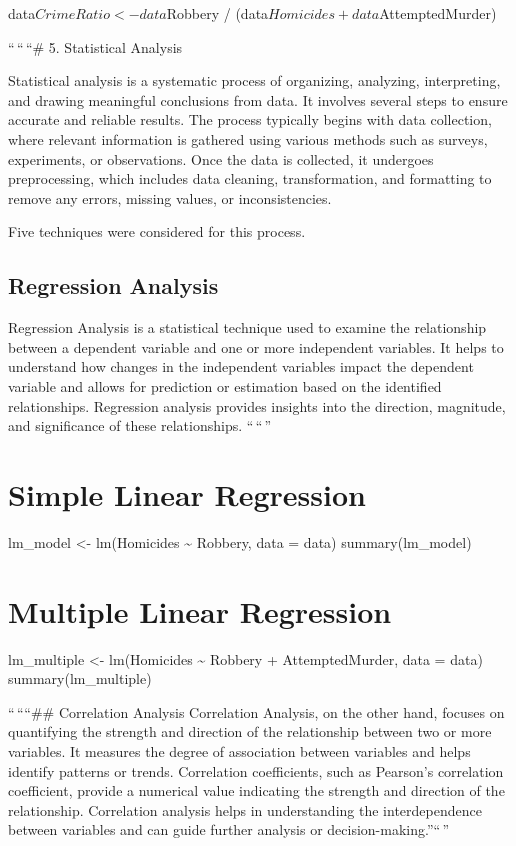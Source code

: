 \documentclass[
]{article}
\begin{document}
data\(CrimeRatio <- data\)Robbery /
(data\(Homicides + data\)AttemptedMurder)

``\,``\,``\# 5. Statistical Analysis

Statistical analysis is a systematic process of organizing, analyzing,
interpreting, and drawing meaningful conclusions from data. It involves
several steps to ensure accurate and reliable results. The process
typically begins with data collection, where relevant information is
gathered using various methods such as surveys, experiments, or
observations. Once the data is collected, it undergoes preprocessing,
which includes data cleaning, transformation, and formatting to remove
any errors, missing values, or inconsistencies.

Five techniques were considered for this process.

\hypertarget{regression-analysis}{%
\subsection{Regression Analysis}\label{regression-analysis}}

Regression Analysis is a statistical technique used to examine the
relationship between a dependent variable and one or more independent
variables. It helps to understand how changes in the independent
variables impact the dependent variable and allows for prediction or
estimation based on the identified relationships. Regression analysis
provides insights into the direction, magnitude, and significance of
these relationships. ``\,``\,''

\hypertarget{simple-linear-regression}{%
\section{Simple Linear Regression}\label{simple-linear-regression}}

lm\_model \textless- lm(Homicides \textasciitilde{} Robbery, data =
data) summary(lm\_model)

\hypertarget{multiple-linear-regression}{%
\section{Multiple Linear Regression}\label{multiple-linear-regression}}

lm\_multiple \textless- lm(Homicides \textasciitilde{} Robbery +
AttemptedMurder, data = data) summary(lm\_multiple)

``\,````\#\# Correlation Analysis Correlation Analysis, on the other
hand, focuses on quantifying the strength and direction of the
relationship between two or more variables. It measures the degree of
association between variables and helps identify patterns or trends.
Correlation coefficients, such as Pearson's correlation coefficient,
provide a numerical value indicating the strength and direction of the
relationship. Correlation analysis helps in understanding the
interdependence between variables and can guide further analysis or
decision-making.''``\,''
\end{document}
